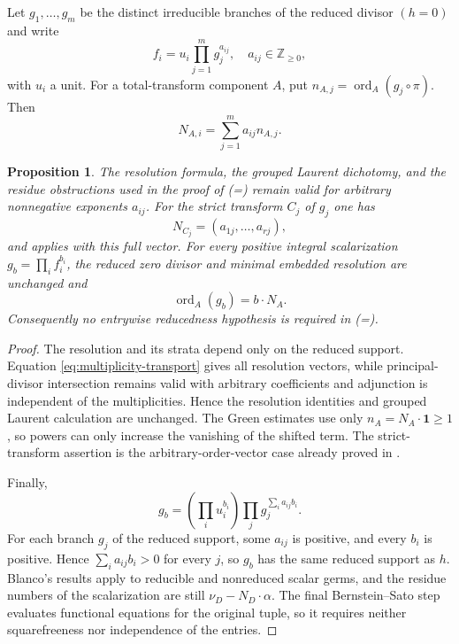 \documentclass[12pt]{amsart}
\numberwithin{equation}{section}
\theoremstyle{plain}
\newtheorem{proposition}[theorem]{Proposition}
\theoremstyle{definition}
\theoremstyle{remark}
\theoremstyle{definition}
\DeclareMathOperator{\ord}{ord}
\newcommand{\Z}{\mathbb Z}
\newcommand{\one}{\mathbf 1}
\begin{document}
Let $g_1,\ldots,g_m$ be the distinct irreducible branches of the reduced divisor $(h=0)$ and write
\begin{equation*}
f_i=u_i\prod_{j=1}^m g_j^{a_{ij}},
 \quad a_{ij}\in\Z_{\geq0},
\end{equation*}
with $u_i$ a unit. For a total-transform component $A$, put $n_{A,j}=\ord_A(g_j\circ\pi)$. Then
\begin{equation}\label{eq:multiplicity-transport}
 N_{A,i}=\sum_{j=1}^m a_{ij}n_{A,j}.
\end{equation}

\begin{proposition}\label{prop:multiplicity-transport}
The resolution formula, the grouped Laurent dichotomy, and the residue obstructions used in the proof of  (=) remain valid for arbitrary nonnegative exponents $a_{ij}$. For the strict transform $C_j$ of $g_j$ one has
\begin{equation*}
N_{C_j}=(a_{1j},\ldots,a_{rj}),
\end{equation*}
and  applies with this full vector. For every positive integral scalarization $g_b=\prod_i f_i^{b_i}$, the reduced zero divisor and minimal embedded resolution are unchanged and
\begin{equation*}
\ord_A(g_b)=b\cdot N_A.
\end{equation*}
Consequently no entrywise reducedness hypothesis is required in  (=).
\end{proposition}

\begin{proof}
The resolution and its strata depend only on the reduced support. Equation \eqref{eq:multiplicity-transport} gives all resolution vectors, while principal-divisor intersection remains valid with arbitrary coefficients and adjunction is independent of the multiplicities. Hence the resolution identities and grouped Laurent calculation are unchanged. The Green estimates use only $n_A=N_A\cdot\one\geq1$, so powers can only increase the vanishing of the shifted term. The strict-transform assertion is the arbitrary-order-vector case already proved in .

Finally,
\begin{equation*}
g_b=\left(\prod_i u_i^{b_i}\right)\prod_jg_j^{\sum_i a_{ij}b_i}.
\end{equation*}
For each branch $g_j$ of the reduced support, some $a_{ij}$ is positive, and every $b_i$ is positive. Hence $\sum_i a_{ij}b_i>0$ for every $j$, so $g_b$ has the same reduced support as $h$. Blanco's results apply to reducible and nonreduced scalar germs, and the residue numbers of the scalarization are still $\nu_D-N_D\cdot\alpha$. The final Bernstein--Sato step evaluates functional equations for the original tuple, so it requires neither squarefreeness nor independence of the entries. 
\end{proof}
\end{document}
